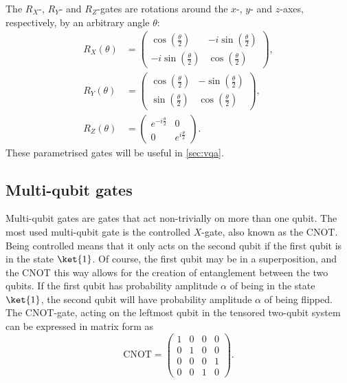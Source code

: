The $R_X$-, $R_Y$- and $R_Z$-gates are rotations around the $x$-, $y$- and $z$-axes, respectively, by an arbitrary angle $\theta$:
\begin{align*}
    R_X(\theta) & = \begin{pmatrix} \cos\left(\frac{\theta}{2}\right) & -i \sin\left(\frac{\theta}{2}\right) \\ -i \sin\left(\frac{\theta}{2}\right) & \cos\left(\frac{\theta}{2}\right) \end{pmatrix}, \\
    R_Y(\theta) & = \begin{pmatrix} \cos\left(\frac{\theta}{2}\right) & -\sin\left(\frac{\theta}{2}\right) \\ \sin\left(\frac{\theta}{2}\right) & \cos\left(\frac{\theta}{2}\right) \end{pmatrix},      \\
    R_Z(\theta) & = \begin{pmatrix} e^{-i\frac{\theta}{2}} & 0 \\ 0 & e^{i\frac{\theta}{2}} \end{pmatrix}.
\end{align*}
These parametrised gates will be useful in \cref{sec:vqa}.

\subsection{Multi-qubit gates}
Multi-qubit gates are gates that act non-trivially on more than one qubit.
The most used multi-qubit gate is the controlled $X$-gate, also known as the CNOT.
Being controlled means that it only acts on the second qubit if the first qubit is in the state $\ket{1}$.
Of course, the first qubit may be in a superposition, and the CNOT this way allows for the creation of entanglement between the two qubits.
If the first qubit has probability amplitude $\alpha$ of being in the state $\ket{1}$, the second qubit will have probability amplitude $\alpha$ of being flipped.
The CNOT-gate, acting on the leftmost qubit in the tensored two-qubit system can be expressed in matrix form as
\begin{equation}
    \text{CNOT} = \begin{pmatrix} 1 & 0 & 0 & 0 \\ 0 & 1 & 0 & 0 \\ 0 & 0 & 0 & 1 \\ 0 & 0 & 1 & 0 \end{pmatrix}.
\end{equation}

